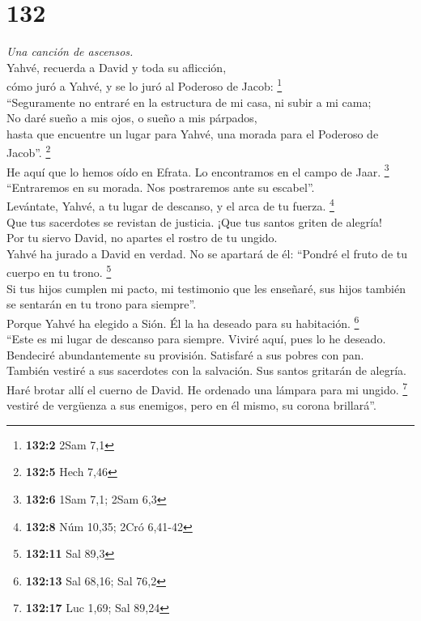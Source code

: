 \hypertarget{section-129}{%
\section{132}\label{section-129}}

\emph{Una canción de ascensos.}\\
 Yahvé, recuerda a David y toda su aflicción,\\
 cómo juró a Yahvé, y se lo juró al Poderoso de Jacob:
\footnote{\textbf{132:2} 2Sam 7,1}\\
 ``Seguramente no entraré en la estructura de mi casa, ni
subir a mi cama;\\
 No daré sueño a mis ojos, o sueño a mis párpados,\\
 hasta que encuentre un lugar para Yahvé, una morada para
el Poderoso de Jacob''. \footnote{\textbf{132:5} Hech 7,46}\\
 He aquí que lo hemos oído en Efrata. Lo encontramos en el
campo de Jaar. \footnote{\textbf{132:6} 1Sam 7,1; 2Sam 6,3}\\
 ``Entraremos en su morada. Nos postraremos ante su
escabel''.\\
 Levántate, Yahvé, a tu lugar de descanso, y el arca de tu
fuerza. \footnote{\textbf{132:8} Núm 10,35; 2Cró 6,41-42}\\
 Que tus sacerdotes se revistan de justicia. ¡Que tus
santos griten de alegría!\\
 Por tu siervo David, no apartes el rostro de tu
ungido.\\
 Yahvé ha jurado a David en verdad. No se apartará de él:
``Pondré el fruto de tu cuerpo en tu trono. \footnote{\textbf{132:11}
  Sal 89,3}\\
 Si tus hijos cumplen mi pacto, mi testimonio que les
enseñaré, sus hijos también se sentarán en tu trono para siempre''.\\
 Porque Yahvé ha elegido a Sión. Él la ha deseado para su
habitación. \footnote{\textbf{132:13} Sal 68,16; Sal 76,2}\\
 ``Este es mi lugar de descanso para siempre. Viviré
aquí, pues lo he deseado.\\
 Bendeciré abundantemente su provisión. Satisfaré a sus
pobres con pan.\\
 También vestiré a sus sacerdotes con la salvación. Sus
santos gritarán de alegría.\\
 Haré brotar allí el cuerno de David. He ordenado una
lámpara para mi ungido. \footnote{\textbf{132:17} Luc 1,69; Sal 89,24}\\
 vestiré de vergüenza a sus enemigos, pero en él mismo,
su corona brillará''.

